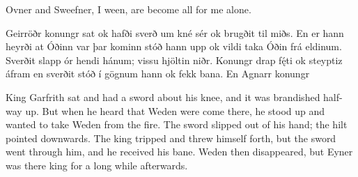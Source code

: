 \bvb Ovner and Sweefner, I ween, are become all for me alone.\evb
\evg


\bpg
\bpa{}Geirröðr konungr sat ok hafði sverð um kné sér ok brugðit til miðs. En er hann heyrði at Óðinn var þar kominn stóð hann upp ok vildi taka Óðin frá eldinum. Sverðit slapp ór hendi hánum; vissu hjöltin niðr. Konungr drap fę́ti ok steyptiz áfram en sverðit stóð í gögnum hann ok fekk  bana.  En Agnarr  konungr \epa

\bpb King Garfrith sat and had a sword about his knee, and it was brandished half-way up. But when he heard that Weden were come there, he stood up and wanted to take Weden from the fire. The sword slipped out of his hand; the hilt pointed downwards. The king tripped and threw himself forth, but the sword went through him, and he received his bane. Weden then disappeared, but Eyner was there king for a long while afterwards.\epb
\epg
